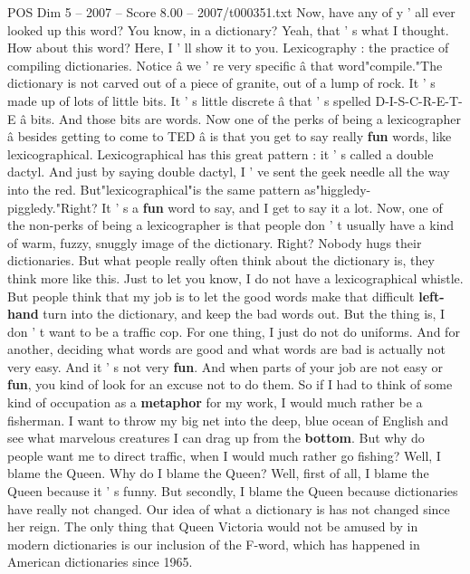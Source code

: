 \begin{textsample}{POS Dim 5 – 2007 – Score 8.00 – 2007/t000351.txt}  \label{ex:f5_pos_026}
Now, have any of y ' all ever looked up this word?
You know, in a dictionary?
Yeah, that ' s what I thought.
How about this word?
Here, I ' ll show it to you.
Lexicography : the practice of compiling dictionaries.
Notice â we ' re very specific â that word"compile."The dictionary is not carved out of a piece of granite, out of a lump of rock.
It ' s made up of lots of little bits.
It ' s little discrete â that ' s spelled D-I-S-C-R-E-T-E â bits.
And those bits are words.
Now one of the perks of being a lexicographer â besides getting to come to TED â is that you get to say really \textbf{fun} words, like lexicographical.
Lexicographical has this great pattern : it ' s called a double dactyl.
And just by saying double dactyl, I ' ve sent the geek needle all the way into the red.
But"lexicographical"is the same pattern as"higgledy- piggledy."Right?
It ' s a \textbf{fun} word to say, and I get to say it a lot.
Now, one of the non-perks of being a lexicographer is that people don ' t usually have a kind of warm, fuzzy, snuggly image of the dictionary.
Right?
Nobody hugs their dictionaries.
But what people really often think about the dictionary is, they think more like this.
Just to let you know, I do not have a lexicographical whistle.
But people think that my job is to let the good words make that difficult \textbf{left-hand} turn into the dictionary, and keep the bad words out.
But the thing is, I don ' t want to be a traffic cop.
For one thing, I just do not do uniforms.
And for another, deciding what words are good and what words are bad is actually not very easy.
And it ' s not very \textbf{fun}.
And when parts of your job are not easy or \textbf{fun}, you kind of look for an excuse not to do them.
So if I had to think of some kind of occupation as a \textbf{metaphor} for my work, I would much rather be a fisherman.
I want to throw my big net into the deep, blue ocean of English and see what marvelous creatures I can drag up from the \textbf{bottom}.
But why do people want me to direct traffic, when I would much rather go fishing?
Well, I blame the Queen.
Why do I blame the Queen?
Well, first of all, I blame the Queen because it ' s funny.
But secondly, I blame the Queen because dictionaries have really not changed.
Our idea of what a dictionary is has not changed since her reign.
The only thing that Queen Victoria would not be amused by in modern dictionaries is our inclusion of the F-word, which has happened in American dictionaries since 1965.

\end{textsample}
